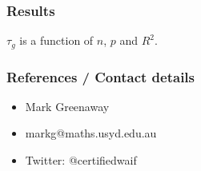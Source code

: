\documentclass{beamer}
\begin{document}
\begin{frame}
	\frametitle{Results}
	$\tau_g$ is a function of $n$, $p$ and $R^2$.
\end{frame}

\begin{frame}
	\frametitle{References / Contact details}
	\begin{itemize}
		\item Mark Greenaway
		\item markg@maths.usyd.edu.au
		\item Twitter: @certifiedwaif	
	\end{itemize}
	
	
\end{frame}
\end{document}
